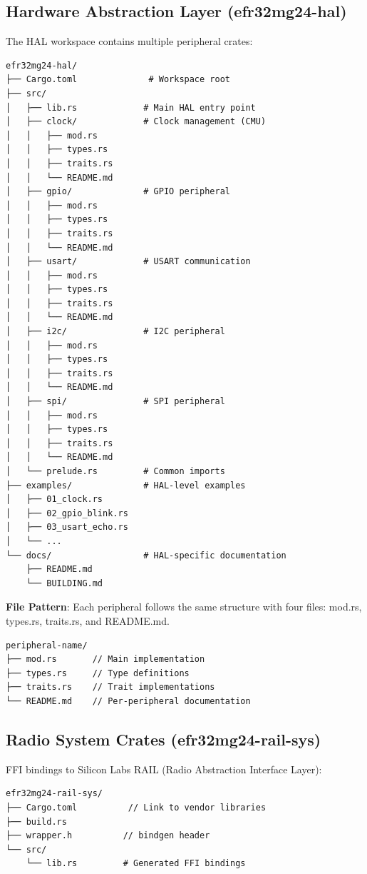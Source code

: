 \subsection{Hardware Abstraction Layer (efr32mg24-hal)}

The HAL workspace contains multiple peripheral crates:

\begin{verbatim}
efr32mg24-hal/
├── Cargo.toml              # Workspace root
├── src/
│   ├── lib.rs             # Main HAL entry point
│   ├── clock/             # Clock management (CMU)
│   │   ├── mod.rs
│   │   ├── types.rs
│   │   ├── traits.rs
│   │   └── README.md
│   ├── gpio/              # GPIO peripheral
│   │   ├── mod.rs
│   │   ├── types.rs
│   │   ├── traits.rs
│   │   └── README.md
│   ├── usart/             # USART communication
│   │   ├── mod.rs
│   │   ├── types.rs
│   │   ├── traits.rs
│   │   └── README.md
│   ├── i2c/               # I2C peripheral
│   │   ├── mod.rs
│   │   ├── types.rs
│   │   ├── traits.rs
│   │   └── README.md
│   ├── spi/               # SPI peripheral
│   │   ├── mod.rs
│   │   ├── types.rs
│   │   ├── traits.rs
│   │   └── README.md
│   └── prelude.rs         # Common imports
├── examples/              # HAL-level examples
│   ├── 01_clock.rs
│   ├── 02_gpio_blink.rs
│   ├── 03_usart_echo.rs
│   └── ...
└── docs/                  # HAL-specific documentation
    ├── README.md
    └── BUILDING.md
\end{verbatim}

\textbf{File Pattern}: Each peripheral follows the same structure with four files: mod.rs, types.rs, traits.rs, and README.md.

\begin{verbatim}
peripheral-name/
├── mod.rs       // Main implementation
├── types.rs     // Type definitions
├── traits.rs    // Trait implementations
└── README.md    // Per-peripheral documentation
\end{verbatim}

\subsection{Radio System Crates (efr32mg24-rail-sys)}

FFI bindings to Silicon Labs RAIL (Radio Abstraction Interface Layer):

\begin{verbatim}
efr32mg24-rail-sys/
├── Cargo.toml          // Link to vendor libraries
├── build.rs
├── wrapper.h          // bindgen header
└── src/
    └── lib.rs         # Generated FFI bindings
\end{verbatim}

